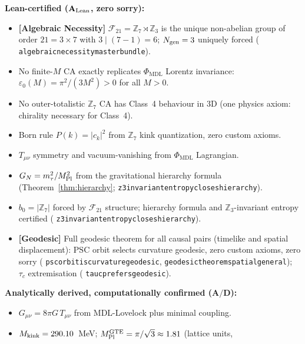 \documentclass[11pt]{article}
\theoremstyle{remark}
\newcommand{\GTE}{\text{GTE}}
\newcommand{\PSC}{\text{PSC}}
\newcommand{\PHIMDL}{\Phi_{\mathrm{MDL}}}
\newcommand{\ZS}{\mathbb{Z}_7}
\newcommand{\ZZ}{\mathbb{Z}}
\newcommand{\lean}[1]{%
  \penalty-100
  \begingroup\def\_{\textunderscore\allowbreak}\texttt{#1}\endgroup}
\newcommand{\epsz}{\varepsilon_0}
\newcommand{\Mkink}{M_{\rm kink}}
\newcommand{\MPltot}{M_{\rm Pl}^{\GTE}}
\newcommand{\FTT}{\mathcal{F}_{21}}
\newcommand{\CatAL}{\ensuremath{\textbf{A}_{\rm Lean}}}
\newcommand{\CatAD}{\textbf{A/D}}
\begin{document}
\tableofcontents
\newpage

\begin{tcolorbox}[colback=orange!6,colframe=orange!70!black,
  title={\textbf{What this paper claims and does not claim}},
  fonttitle=\bfseries,left=6pt,right=6pt,top=5pt,bottom=5pt]
\small
\textbf{Lean-certified ($\CatAL$, zero sorry):}
\begin{itemize}[noitemsep,topsep=2pt]
  \item \textbf{[Algebraic Necessity]} $\FTT = \ZS \rtimes \ZZ_3$ is the unique
        non-abelian group of order $21 = 3\times 7$ with $3 \mid (7-1)=6$;
        $N_{\rm gen}=3$ uniquely forced (\lean{algebraic\_necessity\_master\_bundle}).
  \item No finite-$M$ CA exactly replicates $\PHIMDL$ Lorentz invariance:
        $\epsz(M)=\pi^2/(3M^2)>0$ for all $M>0$.
  \item No outer-totalistic $\ZS$ CA has Class~4 behaviour in 3D
        (one physics axiom: chirality necessary for Class~4).
  \item Born rule $P(k)=|c_k|^2$ from $\ZS$ kink quantization, zero custom axioms.
  \item $T_{\mu\nu}$ symmetry and vacuum-vanishing from $\PHIMDL$ Lagrangian.
  \item $G_N = m_\tau^2/M_{\rm Pl}^2$ from the gravitational hierarchy formula
        (Theorem~\ref{thm:hierarchy}; \lean{z3\_invariant\_entropy\_closes\_hierarchy}).
  \item $b_0 = |\ZS|$ forced by $\FTT$ structure; hierarchy formula and
        $\ZZ_3$-invariant entropy certified
        (\lean{z3\_invariant\_entropy\_closes\_hierarchy}).
  \item \textbf{[Geodesic]} Full geodesic theorem for all causal pairs (timelike
        and spatial displacement): $\PSC$ orbit selects curvature geodesic, zero
        custom axioms, zero sorry
        (\lean{psc\_orbit\_is\_curvature\_geodesic}, \lean{geodesic\_theorem\_spatial\_general});
        $\tau_c$ extremisation (\lean{tau\_c\_prefers\_geodesic}).
\end{itemize}
\textbf{Analytically derived, computationally confirmed ($\CatAD$):}
\begin{itemize}[noitemsep,topsep=2pt]
  \item $G_{\mu\nu} = 8\pi G\,T_{\mu\nu}$ from MDL-Lovelock plus minimal coupling.
  \item $\Mkink = 290.10$~MeV; $\MPltot = \pi/\sqrt{3} \approx 1.81$ (lattice units,

\end{itemize}
\end{tcolorbox}
\end{document}
